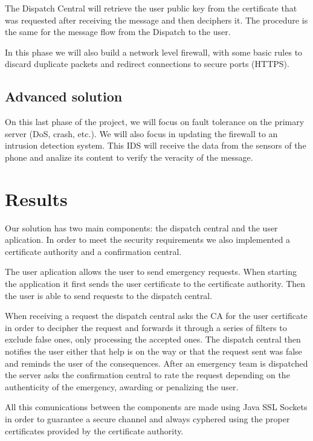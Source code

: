 \documentclass[a4paper,titlepage,11pt]{article}
\begin{document}
The Dispatch Central will retrieve the user public key from the certificate that was requested after receiving
the message and then deciphers it. The procedure is the same for the message flow from the Dispatch to the user.

In this phase we will also build a network level firewall, with some basic rules to discard duplicate packets
and redirect connections to secure ports (HTTPS).

\subsection{Advanced solution}
On this last phase of the project, we will focus on fault tolerance on the primary server (DoS, crash, etc.).
We will also focus in updating the firewall to an intrusion detection system. This IDS will receive the data
from the sensors of the phone and analize its content to verify the veracity of the message.


\section{Results}
Our solution has two main components: the dispatch central and the user aplication.
In order to meet the security requirements we also implemented a certificate authority and a confirmation central.

The user aplication allows the user to send emergency requests. When starting the application it first sends
the user certificate to the certificate authority. Then the user is able to send requests to the dispatch central.

When receiving a request the dispatch central asks the CA for the user certificate in order to decipher the request and
forwards it through a series of filters to exclude false ones, only processing the accepted ones. The dispatch central then
notifies the user either that help is on the way or that the request sent was false and reminds the user of the consequences.
After an emergency team is dispatched the server asks the confirmation central to rate the request depending on the
authenticity of the emergency, awarding or penalizing the user.

All this comunications between the components are made using Java SSL Sockets in order to guarantee a secure channel and
always cyphered using the proper certificates provided by the certificate authority.
\end{document}
